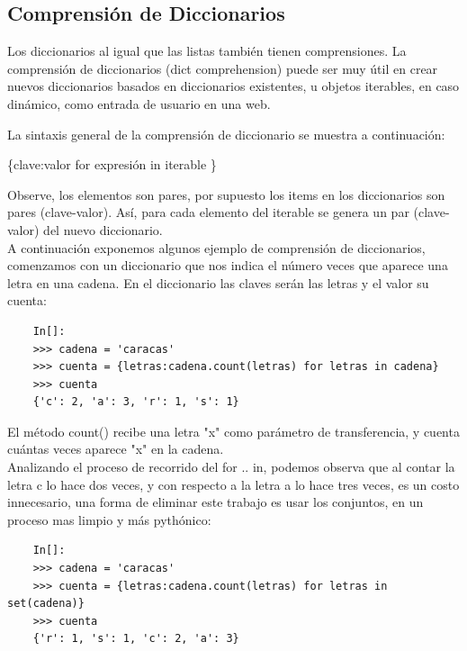 \subsection{Comprensión de Diccionarios}\label{compresionD} 
Los diccionarios al igual que las listas también tienen comprensiones. La comprensión de diccionarios (dict comprehension) puede ser muy útil en crear nuevos diccionarios basados en diccionarios existentes, u objetos iterables, en caso dinámico, como entrada de usuario en una web.

La sintaxis general de la comprensión de diccionario se muestra a continuación:
\begin{center}
	{\ttfamily \{}clave:valor {\ttfamily for} expresión {\ttfamily in} iterable {\ttfamily\}}  
\end{center}\noindent Observe, los elementos son pares, por supuesto los {\ttfamily items} en los diccionarios son pares (clave-valor).  Así, para cada elemento del iterable se  genera un par (clave-valor) del nuevo diccionario.\\

A continuación exponemos algunos ejemplo de comprensión de diccionarios, comenzamos con un diccionario que nos indica el número veces que aparece una letra en una cadena. En el diccionario las claves serán las letras y el valor su cuenta:
\begin{lstlisting}
	In[]:
	>>> cadena = 'caracas'
	>>> cuenta = {letras:cadena.count(letras) for letras in cadena}
	>>> cuenta
	{'c': 2, 'a': 3, 'r': 1, 's': 1}
\end{lstlisting}

El método {\ttfamily count()} recibe una letra  {\ttfamily "{}x{}"{}} como parámetro de transferencia,  y cuenta cuántas veces aparece  {\ttfamily "{}x{}"{}} en la cadena. \\


Analizando el proceso de recorrido del {\ttfamily for .. in},  podemos observa que al contar la letra {\ttfamily c}
lo hace dos veces, y con respecto a la letra  {\ttfamily a} lo hace tres veces, es un costo innecesario, una forma de eliminar este trabajo es usar los conjuntos,  en un proceso mas limpio y más pythónico:

\begin{lstlisting}
	In[]:	
	>>> cadena = 'caracas'
	>>> cuenta = {letras:cadena.count(letras) for letras in set(cadena)}
	>>> cuenta
	{'r': 1, 's': 1, 'c': 2, 'a': 3}
\end{lstlisting}

